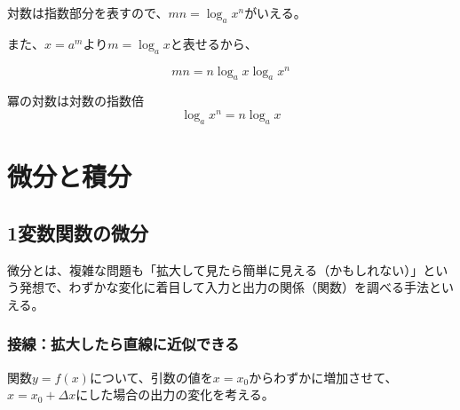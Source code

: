 \documentclass[16pt,b5paper]{book}
\begin{document}
対数は指数部分を表すので、$mn = \log_a x^n$がいえる。

また、$x = a^m$より$m = \log_a x$と表せるから、

\begin{equation}
  mn = n \log_a x \log_a x^n
\end{equation}

\begin{theorem}{冪の対数は対数の指数倍}
  \LARGE
  \begin{equation}
    \log_a x^n = n \log_a x
  \end{equation}
\end{theorem}

\chapter{微分と積分}

\section{1変数関数の微分}

微分とは、複雑な問題も「拡大して見たら簡単に見える（かもしれない）」という発想で、わずかな変化に着目して入力と出力の関係（関数）を調べる手法といえる。

\subsection{接線：拡大したら直線に近似できる}

関数$y=f(x)$について、引数の値を$x=x_0$からわずかに増加させて、$x=x_0+\Delta x$にした場合の出力の変化を考える。
\end{document}

